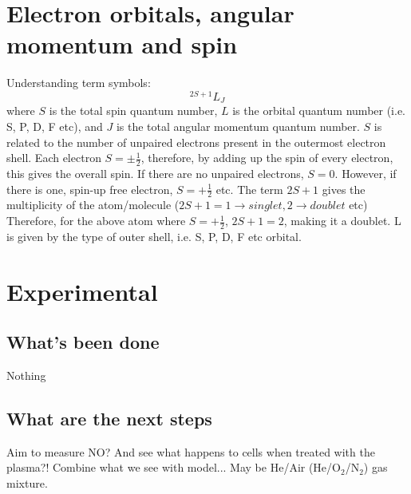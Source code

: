 \documentclass[11pt, oneside]{article}   	%
\begin{document}
\section{Electron orbitals, angular momentum and spin}
Understanding term symbols:
\begin{equation}
^{2S+1}L_{J}
\end{equation}
where $S$ is the total spin quantum number, $L$ is the orbital quantum number (i.e. S, P, D, F etc), and $J$ is the total angular momentum quantum number.
$S$ is related to the number of unpaired electrons present in the outermost electron shell.
Each electron $S = \pm \frac{1}{2}$, therefore, by adding up the spin of every electron, this gives the overall spin. If there are no unpaired electrons, $S = 0$. However, if there is one, spin-up free electron, $S = +\frac{1}{2}$ etc. 
The term $2S + 1$ gives the multiplicity of the atom/molecule ($2S + 1 = 1 \rightarrow singlet, 2 \rightarrow doublet$ etc)
Therefore, for the above atom where $S = +\frac{1}{2}$, $2S + 1 = 2$, making it a doublet.
L is given by the type of outer shell, i.e. S, P, D, F etc orbital.


\section{Experimental}
\subsection{What's been done}
Nothing
\subsection{What are the next steps}
Aim to measure NO? And see what happens to cells when treated with the plasma?!
Combine what we see with model... May be He/Air (He/O$_2$/N$_2$) gas mixture.




\end{document}
